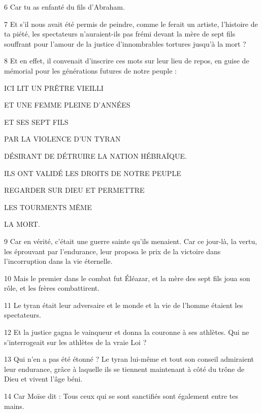 \par 6 Car tu as enfanté du fils d'Abraham.

\par 7 Et s'il nous avait été permis de peindre, comme le ferait un artiste, l'histoire de ta piété, les spectateurs n'auraient-ils pas frémi devant la mère de sept fils souffrant pour l'amour de la justice d'innombrables tortures jusqu'à la mort ?

\par 8 Et en effet, il convenait d'inscrire ces mots sur leur lieu de repos, en guise de mémorial pour les générations futures de notre peuple :

\par ICI LIT UN PRÊTRE VIEILLI
\par ET UNE FEMME PLEINE D'ANNÉES
\par ET SES SEPT FILS
\par PAR LA VIOLENCE D'UN TYRAN
\par DÉSIRANT DE DÉTRUIRE LA NATION HÉBRAÏQUE.
\par ILS ONT VALIDÉ LES DROITS DE NOTRE PEUPLE
\par REGARDER SUR DIEU ET PERMETTRE
\par LES TOURMENTS MÊME
\par LA MORT.

\par 9 Car en vérité, c'était une guerre sainte qu'ils menaient. Car ce jour-là, la vertu, les éprouvant par l'endurance, leur proposa le prix de la victoire dans l'incorruption dans la vie éternelle.

\par 10 Mais le premier dans le combat fut Éléazar, et la mère des sept fils joua son rôle, et les frères combattirent.

\par 11 Le tyran était leur adversaire et le monde et la vie de l'homme étaient les spectateurs.

\par 12 Et la justice gagna le vainqueur et donna la couronne à ses athlètes. Qui ne s’interrogeait sur les athlètes de la vraie Loi ?

\par 13 Qui n'en a pas été étonné ? Le tyran lui-même et tout son conseil admiraient leur endurance, grâce à laquelle ils se tiennent maintenant à côté du trône de Dieu et vivent l'âge béni.

\par 14 Car Moïse dit : Tous ceux qui se sont sanctifiés sont également entre tes mains.

